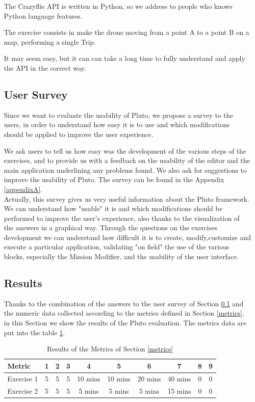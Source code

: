 The Crazyflie API is written in Python, so we address to people who knows Python language features.

The exercise consists in make the drone moving from a point A to a point B on a map, performing a single Trip.

It may seem easy, but it can can take a long time to fully understand and apply the API in the correct way.


\subsection{User Survey}\label{survey}

Since we want to evaluate the usability of Pluto, we propose a survey to the users, in order to understand how easy it is to use and which modifications should be applied to improve the user experience.

We ask users to tell us how easy was the development of the various steps of the exercises, and to provide us with a feedback on the usability of the editor and the main application underlining any problems found.
We also ask for suggestions to improve the usability of Pluto.
The survey can be found in the Appendix \ref{appendixA}.
\\

Actually, this survey gives us very useful information about the Pluto framework. We can understand how "usable" it is and which modifications should be performed to improve the user's experience, also thanks to the visualization of the answers in a graphical way.
Through the questions on the exercises development we can understand how difficult it is to create, modify,customize and execute a particular application, validating "on field" the use of the various blocks, especially the Mission Modifier, and the usability of the user interface.

\subsection{Results}\label{surveyResult}

Thanks to the combination of the answers to the user survey of Section \ref{survey} and the numeric data collected according to the metrics defined in Section \ref{metrics}, in this Section we show the results of the Pluto evaluation.
The metrics data are put into the table \ref{surveyTable}.
\\

\begin{table} [htdp]
\centering
\caption{Results of the Metrics of Section \ref{metrics}}
\label{surveyTable}
    \begin{tabular}{|l|c|c|c|c|c|c|c|c|c|}
    \hline
    Metric & 1 & 2 & 3 &  4 &  5 & 6 &  7 & 8 & 9\\ \hline
    Exercise 1 & 5 & 5 & 5 & 10 mins & 10 mins & 20 mins & 40 mins & 0 & 0 \\ \hline
    Exercise 2 & 5 & 5 & 5 & 5 mins & 5 mins & 5 mins & 15 mins & 0 & 0
     \\ \hline
     \end{tabular}
    \end{table}

